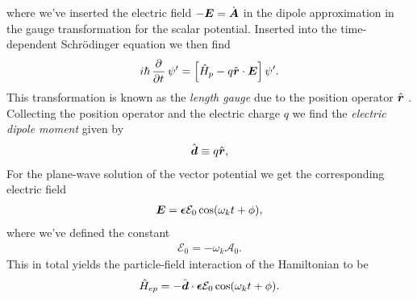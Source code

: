             where we've inserted the electric field $-\boldsymbol{E} = \dot{\boldsymbol{A}}$
            in the dipole approximation in the gauge transformation for the
            scalar potential.
            Inserted into the time-dependent Schrödinger equation we then find
            \begin{align}
                i\hslash\dpd{}{t}\psi'
                = \brak{
                    \hamil_p
                    - q\positionvec\cdot\vfg{E}
                }\psi'.
            \end{align}
            This transformation is known as the \emph{length gauge} due to the
            position operator $\hat{\boldsymbol{r}}$ \cite{joachain2012atoms}.
            Collecting the position operator and the electric charge $q$ we find
            the \emph{electric dipole moment} given by
            \begin{align}
                \hat{\boldsymbol{d}}
                \equiv
                q\hat{\boldsymbol{r}},
            \end{align}
            For the plane-wave solution of the vector potential we get the
            corresponding electric field
            \begin{align}
                \boldsymbol{E}
                = \boldsymbol{\epsilon}\mathcal{E}_0\cos(\omega_k t + \phi),
            \end{align}
            where we've defined the constant
            \begin{align}
                \mathcal{E}_0 = -\omega_k \mathcal{A}_0.
            \end{align}
            This in total yields the particle-field interaction of the
            Hamiltonian to be
            \begin{align}
                \hat{H}_{ep}
                = -\hat{\boldsymbol{d}}\cdot\boldsymbol{\epsilon}
                \mathcal{E}_0\cos(\omega_k t + \phi).
            \end{align}



